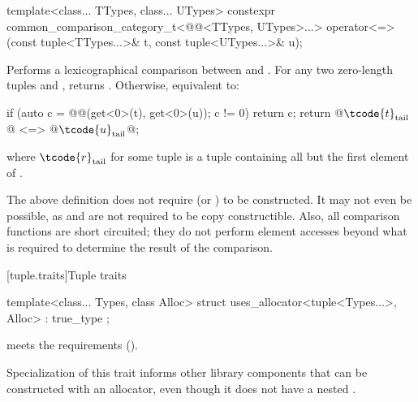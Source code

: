 %
\begin{itemdecl}
template<class... TTypes, class... UTypes>
  constexpr common_comparison_category_t<@@<TTypes, UTypes>...>
    operator<=>(const tuple<TTypes...>& t, const tuple<UTypes...>& u);
\end{itemdecl}

\begin{itemdescr}
\pnum
\effects
Performs a lexicographical comparison between  and .
For any two zero-length tuples  and ,
 returns .
Otherwise, equivalent to:
\begin{codeblock}
if (auto c = @@(get<0>(t), get<0>(u)); c != 0) return c;
return @$\tcode{t}_\mathrm{tail}$@ <=> @$\tcode{u}_\mathrm{tail}$@;
\end{codeblock}
where $\tcode{r}_\mathrm{tail}$ for some tuple 
is a tuple containing all but the first element of .
\end{itemdescr}

\pnum
\begin{note}
The above definition does not require 
(or ) to be constructed. It may not
even be possible, as  and  are not required to be copy
constructible. Also, all comparison functions are short circuited;
they do not perform element accesses beyond what is required to determine the
result of the comparison.
\end{note}

[tuple.traits]{Tuple traits}

%
\begin{itemdecl}
template<class... Types, class Alloc>
  struct uses_allocator<tuple<Types...>, Alloc> : true_type { };
\end{itemdecl}

\begin{itemdescr}
\pnum
\expects
{} meets the 
requirements ().

\pnum
\begin{note}
Specialization of this trait informs other library components that
 can be constructed with an allocator, even though it does not have
a nested .
\end{note}
\end{itemdescr}

